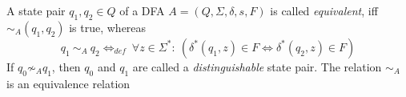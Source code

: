 \begin{definition}\cite[p. 154]{HMU01}
	A state pair $q_1, q_2 \in Q$ of a DFA $A = (Q, \Sigma, \delta, s, F)$ is called \emph{equivalent}, iff $\sim_A(q_1, q_2)$ is true, whereas
	\begin{displaymath}
	q_1\ \sim_A\ q_2 \Leftrightarrow_{def}\ \forall z \in \Sigma^* \colon\ (\delta^*(q_1, z) \in F \Leftrightarrow \delta^*(q_2, z) \in F)
	\end{displaymath}
	If $q_0 \not\sim_A q_1$, then $q_0$ and $q_1$ are called a \emph{distinguishable} state pair. The relation $\sim_A$ is an equivalence relation
\end{definition}

